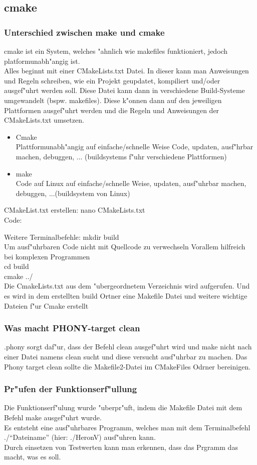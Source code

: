 \documentclass[a4paper,11pt,titlepage]{article}
\begin{document}
\subsection{cmake}
\subsubsection{Unterschied zwischen make und cmake}
cmake ist ein System, welches "ahnlich wie makefiles funktioniert, jedoch platformunabh"angig ist.\\ 
Alles beginnt mit einer CMakeLists.txt Datei. In dieser kann man Anweisungen und Regeln schreiben, wie ein Projekt geupdatet, kompiliert und/oder ausgef"uhrt werden soll. Diese Datei kann dann in verschiedene Build-Systeme umgewandelt (bspw. makefiles). Diese k"onnen dann auf den jeweiligen Plattformen ausgef"uhrt werden und die Regeln und Anweisungen der CMakeLists.txt umsetzen. 
\begin{itemize}
\item Cmake\\
Plattformunabh"angig auf einfache/schnelle Weise Code, updaten, ausf"hrbar machen, debuggen, ... (buildsystems f"uhr verschiedene Plattformen)
\item make\\
Code auf Linux auf einfache/schnelle Weise, updaten, ausf"uhrbar machen, debuggen, ...(buildsystem von Linux)
\end{itemize}
CMakeList.txt erstellen: nano CMakeLists.txt\\
Code:

Weitere Terminalbefehle:
mkdir build\\
Um ausf"uhrbaren Code nicht mit Quellcode zu verwechseln Vorallem hilfreich bei komplexen Programmen\\
cd build\\
cmake ../\\
Die CmakeLists.txt aus dem "ubergeordnetem Verzeichnis wird aufgerufen. Und es wird in dem erstellten build Ortner eine Makefile Datei und weitere wichtige Dateien f"ur Cmake erstellt\\
\subsubsection{Was macht PHONY-target clean}
.phony sorgt daf"ur, dass der Befehl clean ausgef"uhrt wird und make nicht nach einer Datei namens clean sucht und diese versucht ausf"uhrbar zu machen.
Das Phony target clean sollte die Makefile2-Datei im CMakeFiles Odrner bereinigen.
\subsubsection{Pr"ufen der Funktionserf"ullung}
Die Funktionserf"ulung wurde "uberpr"uft, indem die Makefile Datei mit dem Befehl make ausgef"uhrt wurde.\\
Es entsteht eine ausf"uhrbares Programm, welches man mit dem Terminalbefehl  ./"`Dateiname"' (hier: ./HeronV) ausf"uhren kann.\\
Durch einsetzen von Testwerten kann man erkennen, dass das Prgramm das macht, was es soll.
\end{document}

